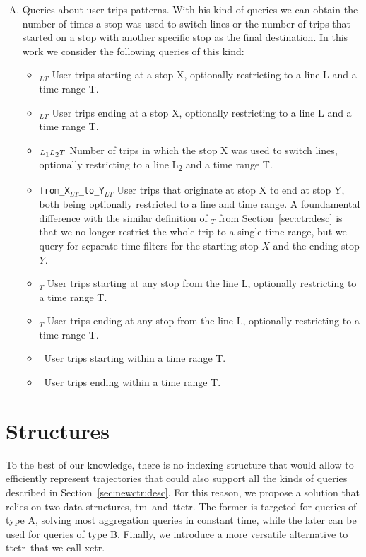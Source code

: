 \begin{enumerate}[A)]
        \item Queries about user trips patterns. With his kind of queries we can obtain the number of times a stop was used to switch lines or the number of trips that started on a stop with another specific stop as the final destination. In this work we consider the following queries of this kind:
        \begin{itemize}
            \item \startX$_{LT}$ User trips starting at a stop X, optionally restricting to a line L and a time range T.
            \item \endX$_{LT}$ User trips ending at a stop X, optionally restricting to a line L and a time range T.
            \item \switchX$_{L\textsubscript{1}L\textsubscript{2}T}$ Number of trips in which the stop X was used to switch lines, optionally restricting to a line L\textsubscript{2} and a time range T.
            \item \texttt{from\_X$_{LT}$\_to\_Y$_{LT}$} User trips that originate at stop X to end at stop Y, both being optionally restricted to a line and time range. A foundamental difference with the similar definition of \XtoY$_T$ from Section~\ref{sec:ctr:desc} is that we no longer restrict the whole trip to a single time range, but we query for separate time filters for the starting stop $X$ and the ending stop $Y$.
            \item \startL$_T$ User trips starting at any stop from the line L, optionally restricting to a time range T.
            \item \endL$_T$ User trips ending at any stop from the line L, optionally restricting to a time range T.
            \item \startT~User trips starting within a time range T.
            \item \endT~User trips ending within a time range T.
        \end{itemize}
    \end{enumerate}
	
\section{Structures}
\label{sec:newctr:str}
    To the best of our knowledge, there is no indexing structure that would allow to efficiently represent trajectories that could also support all the kinds of queries described in Section~\ref{sec:newctr:desc}. For this reason, we propose a solution that relies on two data structures, \gls{tm}~and~\gls{ttctr}. The former is targeted for queries of type A, solving most aggregation queries in constant time, while the later can be used for queries of type B. Finally, we introduce a more versatile alternative to \gls{ttctr}~that we call \gls{xctr}.
    
